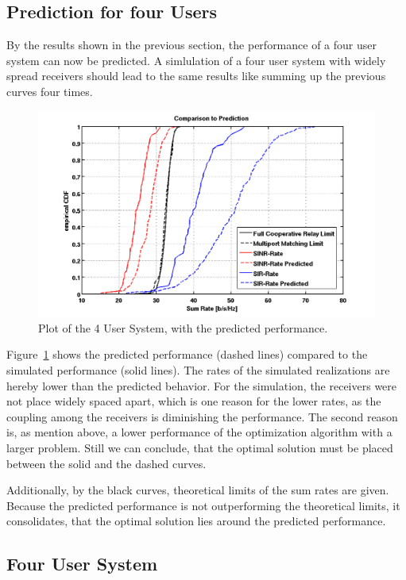 \subsection{Prediction for four Users}
\label{sec:const_prediction}

By the results shown in the previous section, the performance of a four user system can now be predicted.
A simlulation of a four user system with widely spread receivers should lead to the same results like summing up the previous curves four times.
\begin{figure}[h]
\centering
  \includegraphics[width=0.7\linewidth]{images/4user_inklpred.png}
\caption{Plot of the 4 User System, with the predicted performance.}
\label{fig:4user_pred}
\end{figure}

Figure~\ref{fig:4user_pred} shows the predicted performance (dashed lines) compared to the simulated performance (solid lines).
The rates of the simulated realizations are hereby lower than the predicted behavior.
For the simulation, the receivers were not place widely spaced apart, which is one reason for the lower rates, as the coupling among the receivers is diminishing the performance.
The second reason is, as mention above, a lower performance of the optimization algorithm with a larger problem.
Still we can conclude, that the optimal solution must be placed between the solid and the dashed curves.

Additionally, by the black curves, theoretical limits of the sum rates are given.
Because the predicted performance is not outperforming the theoretical limits, it consolidates, that the optimal solution lies around the predicted performance.



\subsection{Four User System}
\label{sec:4user_const}

